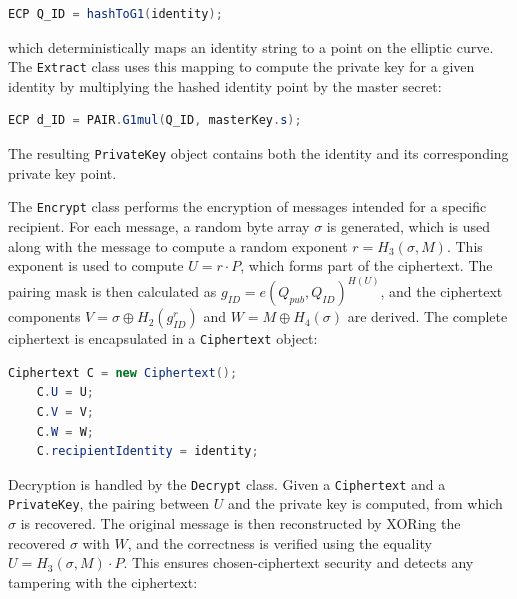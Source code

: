 \vspace{6pt}
\begin{lstlisting}[language=Java, caption={Mapping identity string (hash) to $\mathbb{G}_1$ using ECP.java class}]
	ECP Q_ID = hashToG1(identity);
\end{lstlisting}
\vspace{6pt}

which deterministically maps an identity string to a point on the elliptic curve. The \texttt{Extract} class uses this mapping to compute the private key for a given identity by multiplying the hashed identity point by the master secret:

\vspace{6pt}
\begin{lstlisting}[language=Java, caption={Pairing computation using $G1mul()$ method from ECP java class}]
	ECP d_ID = PAIR.G1mul(Q_ID, masterKey.s);
\end{lstlisting}
\vspace{6pt}

The resulting \texttt{PrivateKey} object contains both the identity and its corresponding private key point.

The \texttt{Encrypt} class performs the encryption of messages intended for a specific recipient. For each message, a random byte array $\sigma$ is generated, which is used along with the message to compute a random exponent $r = H_3(\sigma, M)$. This exponent is used to compute $U = r \cdot P$, which forms part of the ciphertext. The pairing mask is then calculated as $g_{ID} = e(Q_{pub}, Q_{ID})^{H(U)}$, and the ciphertext components $V = \sigma \oplus H_2(g_{ID}^r)$ and $W = M \oplus H_4(\sigma)$ are derived. The complete ciphertext is encapsulated in a \texttt{Ciphertext} object:

\vspace{6pt}
\begin{lstlisting}[language=Java, caption={Masking operations within the Ecrypt.java class}]
	Ciphertext C = new Ciphertext();
	C.U = U;
	C.V = V;
	C.W = W;
	C.recipientIdentity = identity;
\end{lstlisting}
\vspace{6pt}

Decryption is handled by the \texttt{Decrypt} class. Given a \texttt{Ciphertext} and a \texttt{PrivateKey}, the pairing between $U$ and the private key is computed, from which $\sigma$ is recovered. The original message is then reconstructed by XORing the recovered $\sigma$ with $W$, and the correctness is verified using the equality $U = H_3(\sigma, M) \cdot P$. This ensures chosen-ciphertext security and detects any tampering with the ciphertext:

